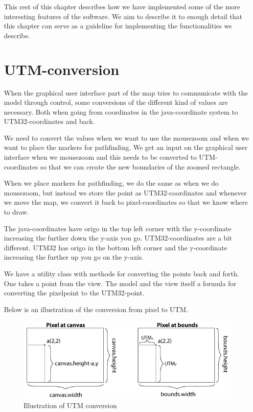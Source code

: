 This rest of this chapter describes how we have implemented some of the more
interesting features of the software. We aim to describe it to enough detail that this
chapter can serve as a guideline for implementing the functionalities we
describe.

\section{UTM-conversion}
\label{IMPL-UTM}
When the graphical user interface part of the map tries to communicate with the
model through control, some conversions of the different kind of values are
necessary. Both when going from coordinates in the java-coordinate system to
UTM32-coordinates and back.

We need to convert the values when we want to use the mousezoom and when we want
to place the markers for pathfinding. We get an input on the graphical user
interface when we mousezoom and this needs to be converted to UTM-coordinates so
that we can create the new boundaries of the zoomed rectangle.

When we place markers for pathfinding, we do the same as when we do mousezoom,
but instead we store the point as UTM32-coordinates and whenever we move the
map, we convert it back to pixel-coordinates so that we know where to draw.

The java-coordinates have origo in the top left corner with the y-coordinate
increasing the further down the y-axis you go. UTM32-coordinates are a bit
different. UTM32 has origo in the bottom left corner and the y-coordinate
increasing the further up you go on the y-axis.

We have a utility class with methods for converting the points back and forth.
One takes a point from the view. The model and the view itself a formula
for converting the pixelpoint to the UTM32-point.

Below is an illustration of the conversion from pixel to UTM.

\begin{figure}[!ht]
\centering
\includegraphics[width=1\linewidth]{images/UTMillu}
\caption{Illustration of UTM conversion}
\label{fig:UTMconversion}
\end{figure}

